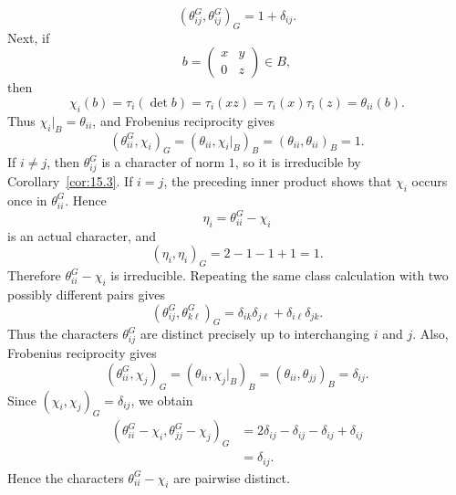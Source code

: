 \documentclass[../Odyssey_Project.tex]{subfiles}
\begin{document}
\begin{solution}
    \[
        (\theta_{ij}^G,\theta_{ij}^G)_G=1+\delta_{ij}.
    \]
    Next, if
    \[
        b=
        \begin{pmatrix}
            x&y\\
            0&z
        \end{pmatrix}\in B,
    \]
    then
    \[
        \chi_i(b)
        =
        \tau_i(\det b)
        =
        \tau_i(xz)
        =
        \tau_i(x)\tau_i(z)
        =
        \theta_{ii}(b).
    \]
    Thus $\chi_i|_B=\theta_{ii}$, and Frobenius reciprocity gives
    \[
        (\theta_{ii}^G,\chi_i)_G
        =
        (\theta_{ii},\chi_i|_B)_B
        =
        (\theta_{ii},\theta_{ii})_B
        =
        1.
    \]
    If $i\neq j$, then $\theta_{ij}^G$ is a character of norm $1$, so it is irreducible by Corollary~\ref{cor:15.3}. If $i=j$, the preceding inner product shows that $\chi_i$ occurs once in $\theta_{ii}^G$. Hence
    \[
        \eta_i=\theta_{ii}^G-\chi_i
    \]
    is an actual character, and
    \[
        (\eta_i,\eta_i)_G
        =
        2-1-1+1
        =
        1.
    \]
    Therefore $\theta_{ii}^G-\chi_i$ is irreducible. Repeating the same class calculation with two possibly different pairs gives
    \[
        (\theta_{ij}^G,\theta_{k\ell}^G)_G
        =
        \delta_{ik}\delta_{j\ell}+\delta_{i\ell}\delta_{jk}.
    \]
    Thus the characters $\theta_{ij}^G$ are distinct precisely up to interchanging $i$ and $j$. Also, Frobenius reciprocity gives
    \[
        (\theta_{ii}^G,\chi_j)_G
        =
        (\theta_{ii},\chi_j|_B)_B
        =
        (\theta_{ii},\theta_{jj})_B
        =
        \delta_{ij}.
    \]
    Since $(\chi_i,\chi_j)_G=\delta_{ij}$, we obtain
    \begin{align*}
        (\theta_{ii}^G-\chi_i,\theta_{jj}^G-\chi_j)_G
        &=
        2\delta_{ij}-\delta_{ij}-\delta_{ij}+\delta_{ij} \\
        &=
        \delta_{ij}.
    \end{align*}
    Hence the characters $\theta_{ii}^G-\chi_i$ are pairwise distinct.
\end{solution}
\end{document}
